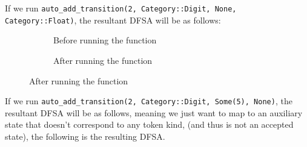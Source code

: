 \documentclass{article}
\newcommand{\code}[1]{\texttt{#1}}
\begin{document}
If we run \code{auto\_add\_transition(2, Category::Digit, None, Category::Float)}, the resultant DFSA will be as follows:

\begin{figure}[H]
    \begin{subfigure}[t]{0.5\textwidth}
        \centering
        \caption{Before running the function}
    \end{subfigure}
    \begin{subfigure}[t]{0.5\textwidth}
        \centering
        \caption{After running the function}
    \end{subfigure}
\end{figure}

If we run \code{auto\_add\_transition(2, Category::Digit, Some(5), None)}, the
resultant DFSA will be as follows, meaning we just want to map to an auxiliary
state that doesn't correspond to any token kind, (and thus is not an accepted
state), the following is the resulting DFSA.
\end{document}
